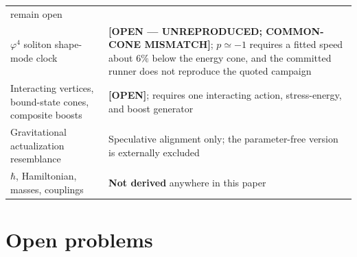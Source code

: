 \documentclass[11pt,a4paper]{article}
\theoremstyle{definition}
\theoremstyle{plain}
\theoremstyle{remark}
\begin{document}
{\begin{longtable}{p{} p{}}
remain open \\
$\varphi^4$ soliton shape-mode clock & \textbf{[OPEN --- UNREPRODUCED; COMMON-CONE
MISMATCH]}; $p\simeq-1$ requires a fitted speed about $6\%$ below the
energy cone, and the committed runner does not reproduce the quoted campaign
\\
Interacting vertices, bound-state cones, composite boosts & \textbf{[OPEN]};
requires one interacting action, stress-energy, and boost generator \\
Gravitational actualization resemblance & Speculative alignment only;
the parameter-free version is externally excluded~\cite{donadi} \\
$\hbar$, Hamiltonian, masses, couplings & \textbf{Not derived} anywhere
in this paper \\
\end{longtable}}

\clearpage

\section{Open problems}
\label{sec:open}
\end{document}
